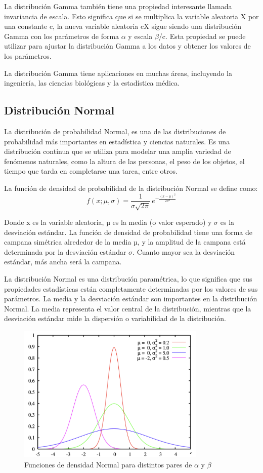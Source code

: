 \documentclass{article}
\begin{document}
 La distribución Gamma también tiene una propiedad interesante llamada invariancia de escala. Esto significa que si se multiplica la variable aleatoria X por una constante c, la nueva variable aleatoria cX sigue siendo una distribución Gamma con los parámetros de forma $\alpha$ y escala $\beta$/c. Esta propiedad se puede utilizar para ajustar la distribución Gamma a los datos y obtener los valores de los parámetros.
 
 La distribución Gamma tiene aplicaciones en muchas áreas, incluyendo la ingeniería, las ciencias biológicas y la estadística médica.

 \subsection{Distribución Normal}
La distribución de probabilidad Normal, es una de las distribuciones de probabilidad más importantes en estadística y ciencias naturales. Es una distribución continua que se utiliza para modelar una amplia variedad de fenómenos naturales, como la altura de las personas, el peso de los objetos, el tiempo que tarda en completarse una tarea, entre otros.

La función de densidad de probabilidad de la distribución Normal se define como:
\begin{equation}
    f(x; \mu, \sigma) = \frac{1}{\sigma \sqrt{2\pi}} \, e^{-\frac{(x - \mu)^2}{2\sigma^2}}
\end{equation}

 Donde x es la variable aleatoria, µ es la media (o valor esperado) y $\sigma$ es la desviación estándar. La función de densidad de probabilidad tiene una forma de campana simétrica alrededor de la media µ, y la amplitud de la campana está determinada por la desviación estándar $\sigma$. Cuanto mayor sea la desviación estándar, más ancha será la campana. 
 
 La distribución Normal es una distribución paramétrica, lo que significa que sus propiedades estadísticas están completamente determinadas por los valores de sus parámetros. La media y la desviación estándar son importantes en la distribución Normal. La media representa el valor central de la distribución, mientras que la desviación estándar mide la dispersión o variabilidad de la distribución.
 
\begin{figure}[H]
    \centering
    \includegraphics[width=0.5\linewidth]{Imagenes/Funciones de densidad Normal para distintos pares de µ y σ.png}
    \caption{Funciones de densidad Normal para distintos pares de $\alpha$ y $\beta$}
    \label{fig:Func.Densidad Normal}
\end{figure}
\end{document}

